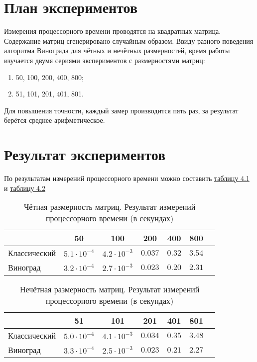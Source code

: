 \section*{План экспериментов}
Измерения процессорного времени проводятся на квадратных матрица. Содержание матриц сгенерировано случайным образом. Ввиду разного поведения алгоритма Винограда для чётных и нечётных размерностей, время работы изучается двумя сериями экспериментов с размерностями матриц:
\begin{enumerate}
	\item 50, 100, 200, 400, 800;
	\item 51, 101, 201, 401, 801.
\end{enumerate}

Для повышения точности, каждый замер производится пять раз, за результат берётся среднее арифметическое.

\section*{Результат экспериментов}
По результатам измерений процессорного времени можно составить \hyperref[table_4_1]{таблицу 4.1} и \hyperref[table_4_2]{таблицу 4.2}

\begin{table}[h] \label{table_4_1}
\caption{Чётная размерность матриц. Результат измерений процессорного времени (в секундах)}
\begin{tabular}{| p{3.5cm} | c | c | c | c | c | c |}
	\hline
					& 50				&100				&200			&400		&800	\\
	\hline\hline
	Классический	&$5.1\cdot10^{-4}$	&$4.2\cdot10^{-3}$	&$0.037$		&$0.32$		&$3.54$	\\
	\hline
	Виноград		&$3.2\cdot10^{-4}$	&$2.7\cdot10^{-3}$	&$0.023$		&$0.20$		&$2.31$	\\
	\hline
\end{tabular}
\end{table}


\begin{table}[h] \label{table_4_2}
	\caption{Нечётная размерность матриц. Результат измерений процессорного времени (в секундах)}
	\begin{tabular}{| p{3.5cm} | c | c | c | c | c | c |}
		\hline
						& 51				&101				&201			&401		&801	\\
		\hline\hline
		Классический	&$5.0\cdot10^{-4}$	&$4.1\cdot10^{-3}$	&$0.034$		&$0.35$		&$3.48$	\\
		\hline
		Виноград		&$3.3\cdot10^{-4}$	&$2.5\cdot10^{-3}$	&$0.023$		&$0.21$		&$2.27$	\\
		\hline
	\end{tabular}
\end{table}

